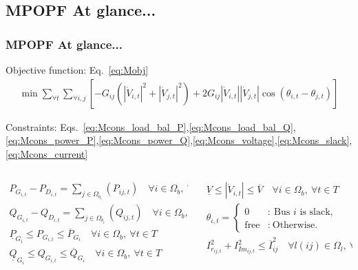 \documentclass[
	11pt, %
	aspectratio=169, %
]{beamer}
\begin{document}

\subsection{MPOPF At glance...}

\begin{frame}
	\frametitle{MPOPF At glance...}
	\label{frame:MPOFP_atglance}
	
	Objective function: Eq.~\eqref{eq:Mobj}
	\begin{align*}
		\min{ \sum_{\forall t} \sum_{\forall i,j} {[-G_{ij}(\left|\dot{V}_{i,t} \right|^2 + \left|\dot{V}_{j,t} \right|^2) + 2G_{ij}\left|\dot{V}_{i,t} \right|\left|\dot{V}_{j,t} \right|\cos\left(\theta_{i,t}-\theta_{j,t} \right) ]} }
	\end{align*}

	Constraints: Eqs.~\eqref{eq:Mcons_load_bal_P},\eqref{eq:Mcons_load_bal_Q},\eqref{eq:Mcons_power_P},\eqref{eq:Mcons_power_Q},\eqref{eq:Mcons_voltage},\eqref{eq:Mcons_slack},\eqref{eq:Mcons_current}

	\vspace{-1.2em}
	\begin{columns}
		\begin{column}{0.5\textwidth}
			\begin{align*}
				P_{G_{i,t}} - P_{D_{i,t}} = \sum_{j \in \Omega_{b_{i}}}(P_{ij,t})  \quad \forall i \in \Omega_{b},\ \forall t \in T\\
				Q_{G_{i,t}} - Q_{D_{i,t}} = \sum_{j \in \Omega_{b_{i}}}(Q_{ij,t})  \quad \forall i \in \Omega_{b},\ \forall t \in T\\
				\underline{P}_{G_{i}} \leq P_{G_{i,t}} \leq \overline{P}_{G_{i}} \quad \forall i \in \Omega_{b},\ \forall t \in T\\
				\underline{Q}_{G_{i}} \leq Q_{G_{i,t}} \leq \overline{Q}_{G_{i}}  \quad \forall i \in \Omega_{b},\ \forall t \in T\\
			\end{align*}
		\end{column}

		\begin{column}{0.5\textwidth}
			\begin{align*}
				\underline{V} \leq \left|\dot{V}_{i,t} \right| \leq \overline{V}  \quad \forall i \in \Omega_{b},\ \forall t \in T\\
				\theta_{i,t} = \left\{ \begin{array}{cl}
							0 & : \ \text{Bus } i \text{ is slack,} \\
							\text{free} & : \ \text{Otherwise.}
							\end{array} \right.\\
				I_{r_{ij,t}}^{2}+ I_{Im_{ij,t}}^{2} \leq \overline{I}_{ij}^{2} \quad   \forall l(ij) \in \Omega_{l},\ \forall t \in T\\
			\end{align*}
		\end{column}
	\end{columns}
	
\end{frame}
\end{document}

